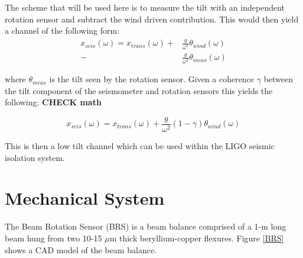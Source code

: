 \documentclass [12pt, proquest]{uwthesis}[2019]
\begin{document}
The scheme that will be used here is to measure the tilt with an independent rotation sensor and subtract the wind driven contribution. This would then yield a channel of the following form:
\begin{align}
x_{seis}(\omega)=x_{trans}(\omega)+&\frac{g}{\omega^2}\theta_{wind}(\omega)\\
-&\frac{g}{\omega^2}\theta_{meas}(\omega)
\end{align}

where $\theta_{meas}$ is the tilt seen by the rotation sensor. Given a coherence $\gamma$ between the tilt component of the seismometer and rotation sensors this yields the following: \textbf{CHECK math}

\[x_{seis}(\omega)=x_{trans}(\omega)+\frac{g}{\omega^2}(1-\gamma)\theta_{wind}(\omega)\]

This is then a low tilt channel which can be used within the LIGO seismic isolation system.

\section{Mechanical System}

\quad The Beam Rotation Sensor (BRS) is a beam balance comprised of a 1-m long beam hung from two 10-15 $\mu$m thick beryllium-copper flexures. Figure \ref{BRS} shows a CAD model of the beam balance. 
\end{document}
